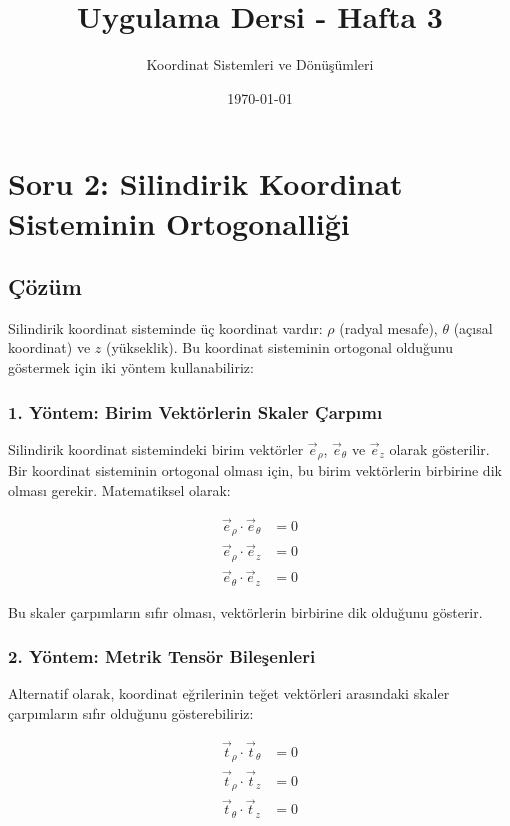 \documentclass{fenbil}
\title{Uygulama Dersi - Hafta 3}
\author{Koordinat Sistemleri ve Dönüşümleri}
\date{\today}
\begin{document}
\maketitle

\section{Soru 2: Silindirik Koordinat Sisteminin Ortogonalliği}

\subsection{Çözüm}

Silindirik koordinat sisteminde üç koordinat vardır: $\rho$ (radyal mesafe), $\theta$ (açısal koordinat) ve $z$ (yükseklik). Bu koordinat sisteminin ortogonal olduğunu göstermek için iki yöntem kullanabiliriz:

\subsubsection{1. Yöntem: Birim Vektörlerin Skaler Çarpımı}

Silindirik koordinat sistemindeki birim vektörler $\vec{e}_\rho$, $\vec{e}_\theta$ ve $\vec{e}_z$ olarak gösterilir. Bir koordinat sisteminin ortogonal olması için, bu birim vektörlerin birbirine dik olması gerekir. Matematiksel olarak:

\begin{align}
\vec{e}_\rho \cdot \vec{e}_\theta &= 0 \\
\vec{e}_\rho \cdot \vec{e}_z &= 0 \\
\vec{e}_\theta \cdot \vec{e}_z &= 0
\end{align}

Bu skaler çarpımların sıfır olması, vektörlerin birbirine dik olduğunu gösterir.

\subsubsection{2. Yöntem: Metrik Tensör Bileşenleri}

Alternatif olarak, koordinat eğrilerinin teğet vektörleri arasındaki skaler çarpımların sıfır olduğunu gösterebiliriz:

\begin{align}
\vec{t}_\rho \cdot \vec{t}_\theta &= 0 \\
\vec{t}_\rho \cdot \vec{t}_z &= 0 \\
\vec{t}_\theta \cdot \vec{t}_z &= 0
\end{align}
\end{document}
